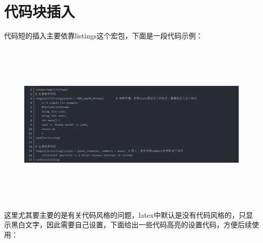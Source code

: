 \part{代码块插入}
代码短的插入主要依靠listings这个宏包，下面是一段代码示例：
\begin{figure}[H]
	\centering
	\includegraphics[height = 8cm, width = 18cm]{figure/1.png}		%
\end{figure}
这里尤其要主要的是有关代码风格的问题，latex中默认是没有代码风格的，只显示黑白文字，因此需要自己设置，下面给出一些代码高亮的设置代码，方便后续使用：
